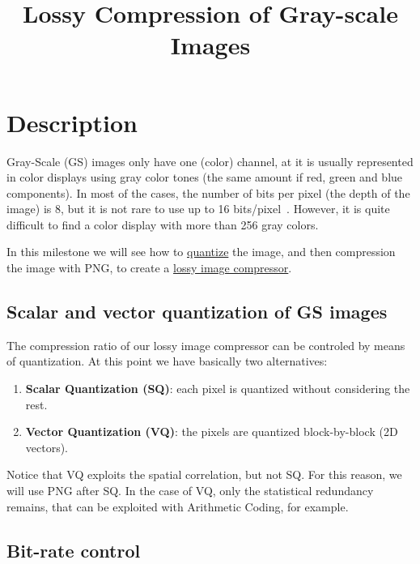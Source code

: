 

\title{Lossy Compression of Gray-scale Images}

\maketitle
\tableofcontents

\section{Description}

Gray-Scale (GS) images only have one (color) channel, at it is usually
represented in color displays using gray color tones (the same amount
if red, green and blue components). In most of the cases, the number
of bits per pixel (the depth of the image) is 8, but it is not rare to
use up to 16 bits/pixel~\cite{burger2016digital}. However, it is quite
difficult to find a color display with more than 256 gray colors.

In this milestone we will see how to
\href{https://vicente-gonzalez-ruiz.github.io/quantization/}{quantize}
the image, and then compression the image with PNG, to create a
\href{https://en.wikipedia.org/wiki/Lossy_compression}{lossy image
  compressor}.

\subsection{Scalar and vector quantization of GS images}

The compression ratio of our lossy image compressor can be controled
by means of quantization. At this point we have basically two
alternatives:
\begin{enumerate}
\item \textbf{Scalar Quantization (SQ)}: each pixel is quantized
  without considering the rest.
\item \textbf{Vector Quantization (VQ)}: the pixels are quantized
  block-by-block (2D vectors).
\end{enumerate}
Notice that VQ exploits the spatial correlation, but not SQ. For this
reason, we will use PNG after SQ. In the case of VQ, only the
statistical redundancy remains, that can be exploited with Arithmetic
Coding, for example.


\subsection{Bit-rate control}

